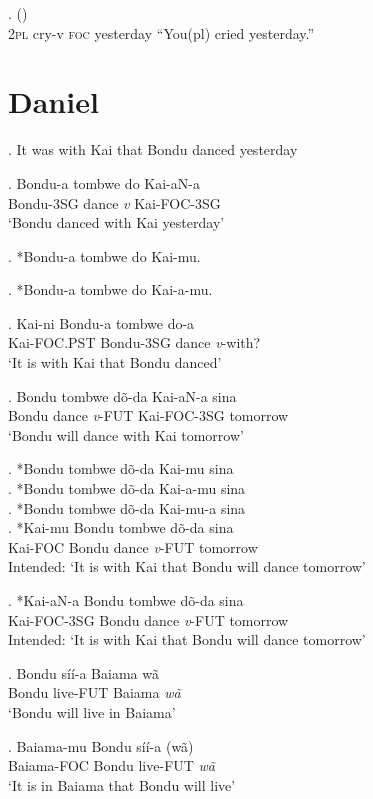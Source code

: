 \documentclass{assets/fieldnotes}
\begin{document}
\ex.   () \\
2\textsc{pl} cry-v \textsc{foc} yesterday
``You(pl) cried yesterday.'' 


\section{Daniel}

\ex. It was with Kai that Bondu danced yesterday

\exg. Bondu-a tombwe do Kai-aN-a\\
Bondu-3SG dance \textit{v} Kai-FOC-3SG\\
`Bondu danced with Kai yesterday'

\ex. *Bondu-a tombwe do Kai-mu.

\ex. *Bondu-a tombwe do Kai-a-mu.

\exg. Kai-ni Bondu-a tombwe do-a\\
Kai-FOC.PST Bondu-3SG dance \textit{v}-with?\\
`It is with Kai that Bondu danced'

\exg. Bondu tombwe dõ-da Kai-aN-a sina\\
Bondu dance \textit{v}-FUT Kai-FOC-3SG tomorrow\\
`Bondu will dance with Kai tomorrow'

\ex. *Bondu tombwe dõ-da Kai-mu sina\\

\ex. *Bondu tombwe dõ-da Kai-a-mu sina\\

\ex. *Bondu tombwe dõ-da Kai-mu-a sina\\

\exg. *Kai-mu Bondu tombwe dõ-da sina\\
Kai-FOC Bondu dance \textit{v}-FUT tomorrow\\
Intended: `It is with Kai that Bondu will dance tomorrow'

\exg. *Kai-aN-a Bondu tombwe dõ-da sina\\
Kai-FOC-3SG Bondu dance \textit{v}-FUT tomorrow\\
Intended: `It is with Kai that Bondu will dance tomorrow'

\ex. Bondu síí-a Baiama wã\\
Bondu live-FUT Baiama \textit{wã}\\
`Bondu will live in Baiama'

\ex. Baiama-mu Bondu síí-a (wã)\\
Baiama-FOC Bondu live-FUT \textit{wã}\\
`It is in Baiama that Bondu will live'
\end{document}
